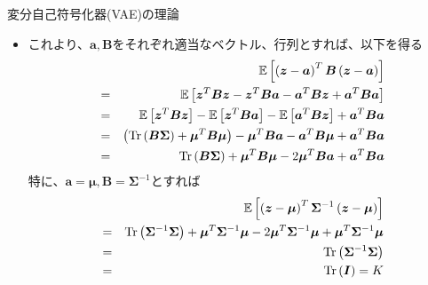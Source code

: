 \documentclass[dvipdfmx,notheorems,t]{beamer}
\begin{document}
\begin{frame}{変分自己符号化器(VAE)の理論}
\begin{itemize}
\begin{itemize}
		\item これより、$\bm{a}, \bm{B}$をそれぞれ適当なベクトル、行列とすれば、以下を得る
		\begin{eqnarray}
			&& \mathbb{E} \left[ \left( \bm{z} - \bm{a} \right)^T \bm{B} \left( \bm{z} - \bm{a} \right) \right] \nonumber \\
			&=& \mathbb{E} \left[ \bm{z}^T \bm{B} \bm{z} - \bm{z}^T \bm{B} \bm{a} - \bm{a}^T \bm{B} \bm{z} + \bm{a}^T \bm{B} \bm{a} \right] \nonumber \\
			&=& \mathbb{E} \left[ \bm{z}^T \bm{B} \bm{z} \right] - \mathbb{E} \left[ \bm{z}^T \bm{B} \bm{a} \right] - \mathbb{E} \left[ \bm{a}^T \bm{B} \bm{z} \right] + \bm{a}^T \bm{B} \bm{a} \nonumber \\
			&=& \left( \operatorname{Tr} \left( \bm{B} \bm{\Sigma} \right) + \bm{\mu}^T \bm{B} \bm{\mu} \right) - \bm{\mu}^T \bm{B} \bm{a} - \bm{a}^T \bm{B} \bm{\mu} + \bm{a}^T \bm{B} \bm{a} \nonumber \\
			&=& \operatorname{Tr} \left( \bm{B} \bm{\Sigma} \right) + \bm{\mu}^T \bm{B} \bm{\mu} - 2 \bm{\mu}^T \bm{B} \bm{a} + \bm{a}^T \bm{B} \bm{a}
		\end{eqnarray}
		特に、$\bm{a} = \bm{\mu}, \bm{B} = \bm{\Sigma}^{-1}$とすれば
		\begin{eqnarray}
			&& \mathbb{E} \left[ \left( \bm{z} - \bm{\mu} \right)^T \bm{\Sigma}^{-1} \left( \bm{z} - \bm{\mu} \right) \right] \nonumber \\
			&=& \operatorname{Tr} \left( \bm{\Sigma}^{-1} \bm{\Sigma} \right) + \bm{\mu}^T \bm{\Sigma}^{-1} \bm{\mu} - 2 \bm{\mu}^T \bm{\Sigma}^{-1} \bm{\mu} + \bm{\mu}^T \bm{\Sigma}^{-1} \bm{\mu} \nonumber \\
			&=& \operatorname{Tr} \left( \bm{\Sigma}^{-1} \bm{\Sigma} \right) \nonumber \\
			&=& \operatorname{Tr} \left( \bm{I} \right) = K
		\end{eqnarray}
		

\end{itemize}
\end{itemize}
\end{frame}
\end{document}
